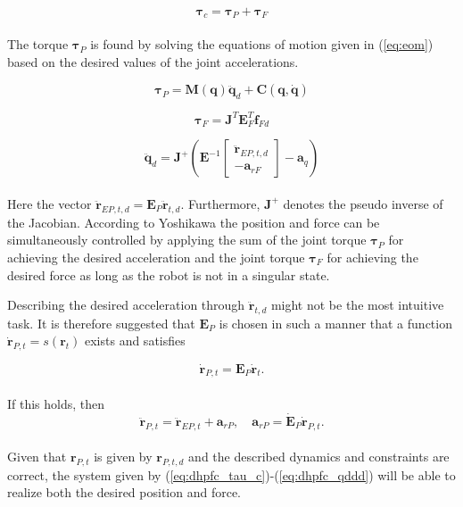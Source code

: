 \begin{equation}\label{eq:dhpfc_tau_c}
    \boldsymbol{\tau}_c = \boldsymbol{\tau}_P + \boldsymbol{\tau}_F
\end{equation}
\\
The torque $\boldsymbol{\tau}_P$ is found by solving the equations of motion given in (\ref{eq:eom}) based on the desired values of the joint accelerations.

\begin{equation}\label{eq:dhpfc_taup}
    \boldsymbol{\tau}_P = \mathbf{M(q)} \ddot{\mathbf{q}}_d + \mathbf{C}(\mathbf{q,\dot{q}})
\end{equation}

\begin{equation}\label{eq:dhpfc_tauf}
    \boldsymbol{\tau}_F = \mathbf{J}^T \mathbf{E}^T_F \mathbf{f}_{Fd}
\end{equation}

\begin{equation}\label{eq:dhpfc_qddd}
    \ddot{\mathbf{q}}_d = \mathbf{J}^+ (\mathbf{E}^{-1} 
    \begin{bmatrix}
        \mathbf{\ddot{r}}_{EP,t,d} \\
        - \mathbf{a}_{rF}
    \end{bmatrix}
    - \mathbf{a}_q)
\end{equation}
\\
Here the vector $\mathbf{\ddot{r}}_{EP,t,d} = \mathbf{E}_P \mathbf{\ddot{r}}_{t,d}$. Furthermore, $\mathbf{J}^+$ denotes the pseudo inverse of the Jacobian. According to Yoshikawa \cite{yoshikawa1987dynamic} the position and force can be simultaneously controlled by applying the sum of the joint torque $\boldsymbol{\tau}_P$ for achieving the desired acceleration and the joint torque $\boldsymbol{\tau}_F$ for achieving the desired force as long as the robot is not in a singular state.

Describing the desired acceleration through $\mathbf{\ddot{r}}_{t,d}$ might not be the most intuitive task. It is therefore suggested that $\mathbf{E}_P$ is chosen in such a manner that a function $\mathbf{\dot{r}}_{P,t} = s(\mathbf{r}_t)$ exists and satisfies

\begin{equation}
    \mathbf{\dot{r}}_{P,t} = \mathbf{E}_P \mathbf{\dot{r}}_t.
\end{equation}
\\
If this holds, then
\begin{equation}
    \mathbf{\ddot{r}}_{P,t} = \mathbf{\ddot{r}}_{EP,t} + \mathbf{a}_{rP}, \quad \mathbf{a}_{rP} = \mathbf{\dot{E}}_P \mathbf{\dot{r}}_{P,t}.
\end{equation}
\\
Given that $\mathbf{r}_{P,t}$ is given by $\mathbf{r}_{P,t,d}$ and the described dynamics and constraints are correct, the system given by (\ref{eq:dhpfc_tau_c})-(\ref{eq:dhpfc_qddd}) will be able to realize both the desired position and force.


